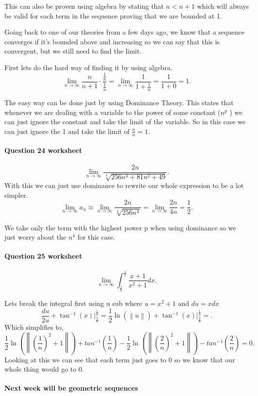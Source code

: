 This can also be proven using algebra by stating that $ n<n+1 $ which will always be valid for each term in the sequence proving that we are bounded at 1. 

Going back to one of our theories from a few days ago, we know that a sequence converges if it's bounded above and increasing so we can say that this is convergent, but we still need to find the limit.

First lets do the hard way of finding it by using algebra. 
\[
\lim_{ n \to \infty} \frac{ n }{ n+1 } \cdot \frac{ \frac{ 1 }{ n }  }{ \frac{ 1 }{ n }  }= \lim_{ n \to \infty} \frac{ 1 }{ 1+\frac{ 1 }{ n }  }= \frac{ 1 }{ 1+0 } =1
.\] 

The easy way can be done just by using Dominance Theory. This states that whenever we are dealing with a variable to the power of some constant ($ n^{ p } $ ) we can just ignore the constant and take the limit of the variable. So in this case we can just ignore the 1 and take the limit of $ \frac{ n }{ n } =1$.
\newpage
\paragraph{Question 24 worksheet}
\[
\lim_{ n \to \infty} \frac{ 2n }{ \sqrt[ 4 ]{ 256n^{ 4 }+81n^2+49 }  }
.\] 
With this we can just use dominance to rewrite our whole expression to be a lot simpler. 
\[
\lim_{ n \to \infty} a_n \approx \lim_{ n \to \infty} \frac{ 2n }{ \sqrt[ 4 ]{ 256n^{ 4 } }  } =\lim_{ n \to \infty} \frac{ 2n }{ 4n } =\frac{ 1 }{ 2 } 
.\] 

We take only the term with the highest power p when using dominance so we just worry about the $ n^{ 4 } $ for this case.

\paragraph{Question 25 worksheet}
\[
\lim_{ n \to \infty} \int_{ \frac{ 2 }{ n }  }^{ \frac{ 1 }{ n }  } \frac{ x+1 }{ x^2+1 }dx
.\] 

Lets break the integral first using u sub where $ u=x^2+1 \text{ and }du=xdx $ 
\[
 \frac{ du }{ 2u } +\tan^{-1}\left( x \right) \Big|_{ \frac{ 2 }{ n }  }^{ \frac{ 1 }{ n }  } =\frac{ 1 }{ 2 } \ln\left( \left\| u \right\| \right) +\tan^{-1}\left( x \right) \Big|_{ \frac{ 2 }{ n }  }^{ \frac{ 1 }{ n }  }=
.\] 
Which simplifies to,
\[
\frac{ 1 }{ 2 } \ln^{  } \left( \left\| \left( \frac{ 1 }{ n }  \right) ^2 +1\right\| \right) + tan^{ -1 }\left( \frac{ 1 }{ n }  \right) -\frac{ 1 }{ 2 } \ln^{  } \left( \left\| \left( \frac{ 2 }{ n }  \right) ^2 +1\right\| \right) - tan^{ -1 }\left( \frac{ 2 }{ n }  \right) =0
.\] 
Looking at this we can see that each term just goes to 0 so we know that our whole thing would go to 0. 

\paragraph{Next week will be geometric sequences}

